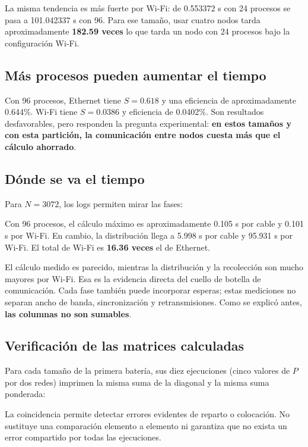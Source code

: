 La misma tendencia es más fuerte por Wi-Fi: de 0.553372 s con 24 procesos se pasa a 101.042337 s con 96. Para ese tamaño, usar cuatro nodos tarda aproximadamente \textbf{182.59 veces} lo que tarda un nodo con 24 procesos bajo la configuración Wi-Fi.

\subsection{Más procesos pueden aumentar el tiempo}



Con 96 procesos, Ethernet tiene $S=0.618$ y una eficiencia de aproximadamente 0.644\%. Wi-Fi tiene $S=0.0386$ y eficiencia de 0.0402\%. Son resultados desfavorables, pero responden la pregunta experimental: \textbf{en estos tamaños y con esta partición, la comunicación entre nodos cuesta más que el cálculo ahorrado}.

\subsection{Dónde se va el tiempo}
Para $N=3072$, los logs permiten mirar las fases:


Con 96 procesos, el cálculo máximo es aproximadamente 0.105 s por cable y 0.101 s por Wi-Fi. En cambio, la distribución llega a 5.998 s por cable y 95.931 s por Wi-Fi. El total de Wi-Fi es \textbf{16.36 veces} el de Ethernet.

El cálculo medido es parecido, mientras la distribución y la recolección son mucho mayores por Wi-Fi. Esa es la evidencia directa del cuello de botella de comunicación. Cada fase también puede incorporar esperas; estas mediciones no separan ancho de banda, sincronización y retransmisiones. Como se explicó antes, \textbf{las columnas no son sumables}.

\subsection{Verificación de las matrices calculadas}
Para cada tamaño de la primera batería, sus diez ejecuciones (cinco valores de $P$ por dos redes) imprimen la misma suma de la diagonal y la misma suma ponderada:

La coincidencia permite detectar errores evidentes de reparto o colocación. No sustituye una comparación elemento a elemento ni garantiza que no exista un error compartido por todas las ejecuciones.

